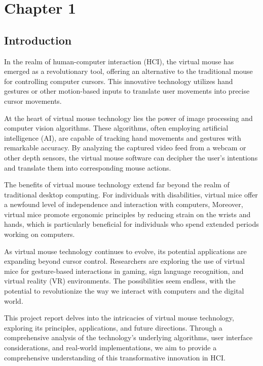 \documentclass[12pt,a4paper]{report}
\begin{document}
		\tableofcontents

	
	\renewcommand{\thesection}{\arabic{section}}
	\newpage
	{\vfill \chapter*{\centering \vfill Chapter 1 \vfill}\vfill}
	\thispagestyle{empty}
	\newpage

	\label{Introduction}
	\section{Introduction}
		{In the realm of human-computer interaction (HCI), the virtual mouse has emerged as a revolutionary tool, offering an alternative to the traditional mouse for controlling computer cursors. This innovative technology utilizes hand gestures or other motion-based inputs to translate user movements into precise cursor movements. 

 

At the heart of virtual mouse technology lies the power of image processing and computer vision algorithms. These algorithms, often employing artificial intelligence (AI), are capable of tracking hand movements and gestures with remarkable accuracy. By analyzing the captured video feed from a webcam or other depth sensors, the virtual mouse software can decipher the user's intentions and translate them into corresponding mouse actions. 

 

The benefits of virtual mouse technology extend far beyond the realm of traditional desktop computing. For individuals with disabilities, virtual mice offer a newfound level of independence and interaction with computers, Moreover, virtual mice promote ergonomic principles by reducing strain on the wrists and hands, which is particularly beneficial for individuals who spend extended periods working on computers. 

As virtual mouse technology continues to evolve, its potential applications are expanding beyond cursor control. Researchers are exploring the use of virtual mice for gesture-based interactions in gaming, sign language recognition, and virtual reality (VR) environments. The possibilities seem endless, with the potential to revolutionize the way we interact with computers and the digital world. 

 

This project report delves into the intricacies of virtual mouse technology, exploring its principles, applications, and future directions. Through a comprehensive analysis of the technology's underlying algorithms, user interface considerations, and real-world implementations, we aim to provide a comprehensive understanding of this transformative innovation in HCI. }
	\label{Problem Statement}
\end{document}
